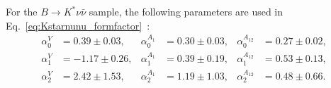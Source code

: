 For the $B\rightarrow K^{*}\nu \bar{\nu}$ sample, the following parameters are used in Eq.~\ref{eq:Kstarnunu_formfactor}~\cite{Bharucha:2015bzk}:
\begin{equation}
  \label{eq:Kstnunu_alpha}
  \begin{aligned}
    \alpha_{0}^{V} &= 0.39 \pm 0.03, &
    \alpha_{0}^{A_{1}} &= 0.30 \pm 0.03, &
    \alpha_{0}^{A_{12}} &= 0.27 \pm 0.02, \\
    \alpha_{1}^{V} &= -1.17 \pm 0.26, &
    \alpha_{1}^{A_{1}} &= 0.39 \pm 0.19, &
    \alpha_{1}^{A_{12}} &= 0.53 \pm 0.13, \\
    \alpha_{2}^{V} &= 2.42 \pm 1.53, &
    \alpha_{2}^{A_{1}} &= 1.19 \pm 1.03, &
    \alpha_{2}^{A_{12}} &= 0.48 \pm 0.66.
  \end{aligned}
\end{equation}

